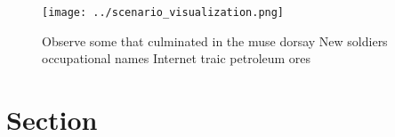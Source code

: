 \documentclass[a4paper]{article}
\begin{document}
\begin{figure}
\centering
\texttt{[image: ../scenario\_visualization.png]}
\caption{Observe some that culminated in the muse dorsay New soldiers occupational names Internet traic petroleum ores
}
\end{figure}
 
\section{Section}
\end{document}
